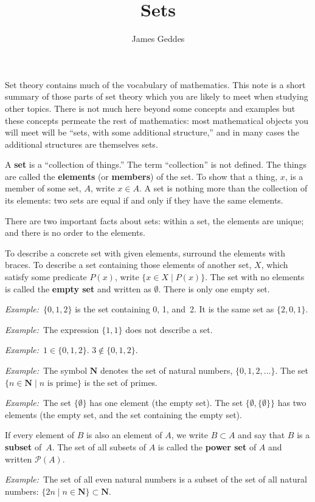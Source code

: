 \documentclass[12pt, a4paper]{article}
\title{\vspace{-6ex}Sets}
\author{James Geddes}
\newcommand{\defn}[1]{\textbf{#1}}
\newcommand{\set}[1]{\mathbold{#1}}
\newcommand{\eg}{\emph{Example:}\relax}
\begin{document}
\maketitle

Set theory contains much of the vocabulary of mathematics. This note
is a short summary of those parts of set theory which you are likely
to meet when studying other topics. There is not much here beyond some
concepts and examples but these concepts permeate the rest of
mathematics: most mathematical objects you will meet will be “sets,
with some additional structure,” and in many cases the additional
structures are themselves sets.

A \defn{set} is a “collection of things.” The term “collection” is not
defined. The things are called the \defn{elements} (or \defn{members})
of the set. To show that a thing, $x$, is a member of some set,
$A$, write $x \in A$. A set is nothing more than the collection of its
elements: two sets are equal if and only if they have the same elements.

There are two important facts about sets: within a set, the elements
are unique; and there is no order to the elements.

To describe a concrete set with given elements, surround the elements
with braces. To describe a set containing those elements of another
set, $X$, which satisfy some predicate $P(x)$, write $\{x \in X \mid
P(x)\}$. The set with no elements is called the \defn{empty set} and
written as $\emptyset$. There is only one empty set.

\eg\ $\{0, 1, 2\}$ is the set containing 0, 1, and~2. It is the same
set as $\{2,0,1\}$.

\eg\ The expression $\{1, 1\}$ does not describe a set.

\eg\ $1\in\{0,1,2\}$. $3\notin\{0,1,2\}$.

\eg\ The symbol $\set{N}$ denotes the set of natural numbers,
$\{0,1,2,\dotsc\}$. The set $\{n \in \set{N} \mid \text{$n$ is prime}\}$ is
the set of primes.

\eg\ The set $\{\emptyset\}$ has one element (the empty set). The set $\{\emptyset,
\{\emptyset\}\}$ has two elements (the empty set, and the set containing the
empty set).

If every element of $B$ is also an element of $A$, we write $B \subset A$
and say that $B$ is a \defn{subset} of~$A$. The set of all subsets of
$A$ is called the \defn{power set} of $A$ and written $\mathcal{P}(A)$.

\eg\ The set of all even natural numbers is a subset of the set of all
natural numbers: $\{2n \mid n \in \set{N}\} \subset \set{N}$.
\end{document}
